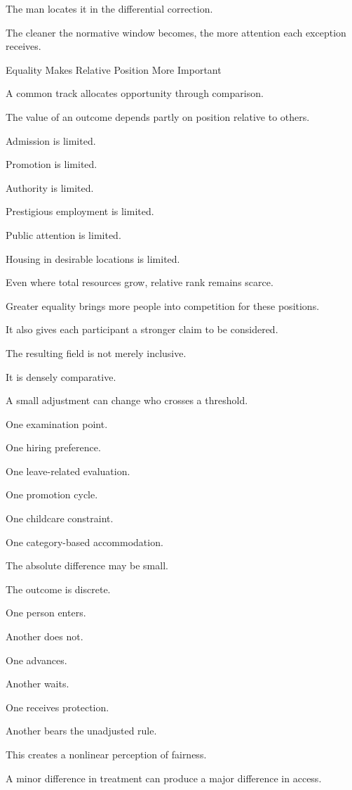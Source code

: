 The man locates it in the differential correction.

The cleaner the normative window becomes, the more attention each exception receives.

Equality Makes Relative Position More Important

A common track allocates opportunity through comparison.

The value of an outcome depends partly on position relative to others.

Admission is limited.

Promotion is limited.

Authority is limited.

Prestigious employment is limited.

Public attention is limited.

Housing in desirable locations is limited.

Even where total resources grow, relative rank remains scarce.

Greater equality brings more people into competition for these positions.

It also gives each participant a stronger claim to be considered.

The resulting field is not merely inclusive.

It is densely comparative.

A small adjustment can change who crosses a threshold.

One examination point.

One hiring preference.

One leave-related evaluation.

One promotion cycle.

One childcare constraint.

One category-based accommodation.

The absolute difference may be small.

The outcome is discrete.

One person enters.

Another does not.

One advances.

Another waits.

One receives protection.

Another bears the unadjusted rule.

This creates a nonlinear perception of fairness.

A minor difference in treatment can produce a major difference in access.

